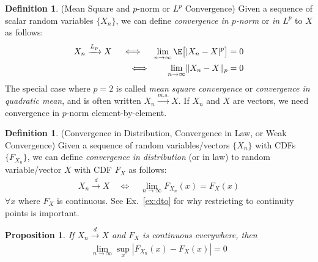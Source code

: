 \documentclass[12pt]{article}
\theoremstyle{plain}
\newtheorem{prop}[thm]{Proposition}
\theoremstyle{definition}
\newtheorem{defn}[thm]{Definition}
\theoremstyle{remark}
\newcommand{\msto}{\xrightarrow{m.s.}}
\newcommand{\dto}{\xrightarrow{d}}
\newcommand{\Lpto}{\xrightarrow{L_p}}
\newcommand{\limn}{\lim_{n\rightarrow\infty}}
\begin{document}
\begin{defn}{(Mean Square and $p$-norm or $L^p$ Convergence)}
Given a sequence of scalar random variables $\{ X_n \}$, we can define
\emph{convergence in $p$-norm} or \emph{in $L^p$} to $X$ as follows:
\begin{align*}
  X_n \Lpto X
  \quad\iff\quad
  \limn \E\big[|X_n-X|^p\big] &= 0 \\
  \iff\quad\;\;\;
  \limn \lVert X_n-X\rVert_p &= 0
\end{align*}
The special case where $p=2$ is called \emph{mean square convergence} or
\emph{convergence in quadratic mean}, and is often written $X_n\msto X$.
If $X_n$ and $X$ are vectors, we need convergence in $p$-norm
element-by-element.
\end{defn}


\clearpage
\begin{defn}
\label{defn:convergeInDistribution}
(Convergence in Distribution, Convergence in Law, or Weak Convergence)
Given a sequence of random variables/vectors $\{X_n\}$ with
CDFs $\{F_{X_n}\}$, we can define \emph{convergence in distribution} (or
in law) to random variable/vector $X$ with CDF $F_X$ as follows:
\begin{align*}
  X_n\dto X
  \quad\iff\quad
  \limn F_{X_n}(x) = F_X(x)
\end{align*}
$\forall x$ where $F_X$ is continuous.
See Ex.~\ref{ex:dto} for why restricting to continuity points is
important.
\end{defn}

\begin{prop}
If $X_n\dto X$ and $F_X$ is continuous everywhere, then
\begin{align*}
  \limn \sup_x |F_{X_n}(x)-F_X(x)| = 0
\end{align*}
\end{prop}
\end{document}
